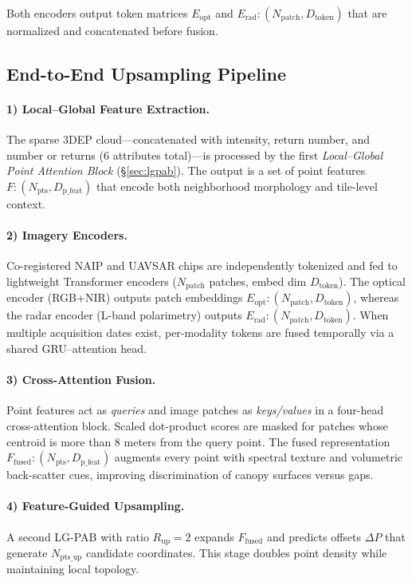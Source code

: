 \documentclass[remotesensing,article,submit,pdftex,moreauthors]{Definitions/mdpi}
\begin{document}
Both encoders output token matrices $E_{\text{opt}}$ and $E_{\text{rad}}: (N_{\text{patch}}, D_{\text{token}})$ that are normalized and concatenated before fusion.



\subsection{End-to-End Upsampling Pipeline}
\label{sec:pipeline}

\paragraph{1) Local–Global Feature Extraction.}
The sparse 3DEP cloud—concatenated with intensity, return number, and number or returns (6 attributes total)—is processed by the first \emph{Local–Global Point Attention Block} (§\ref{sec:lgpab}). The output is a set of point features $F: (N_{\text{pts}}, D_{\text{p\_feat}})$ that encode both neighborhood morphology and tile-level context.

\paragraph{2) Imagery Encoders.}
Co-registered NAIP and UAVSAR chips are independently tokenized and fed to lightweight Transformer encoders ($N_{\text{patch}}$ patches, embed dim $D_{\text{token}}$).  
The optical encoder (RGB+NIR) outputs patch embeddings $E_{\text{opt}}: (N_{\text{patch}}, D_{\text{token}})$, whereas the radar encoder (L-band polarimetry) outputs $E_{\text{rad}}: (N_{\text{patch}}, D_{\text{token}})$.  
When multiple acquisition dates exist, per-modality tokens are fused temporally via a shared GRU–attention head.

\paragraph{3) Cross-Attention Fusion.}
Point features act as \emph{queries} and image patches as \emph{keys/values} in a four-head cross-attention block.  
Scaled dot-product scores are masked for patches whose centroid is more than 8 meters from the query point. 
The fused representation $F_{\text{fused}}: (N_{\text{pts}}, D_{\text{p\_feat}})$ augments every point with spectral texture and volumetric back-scatter cues, improving discrimination of canopy surfaces versus gaps.

\paragraph{4) Feature-Guided Upsampling.}
A second LG-PAB with ratio $R_{\text{up}}=2$ expands $F_{\text{fused}}$ and predicts offsets $\Delta P$ that generate $N_{\text{pts\_up}}$ candidate coordinates. This stage doubles point density while maintaining local topology.
\end{document}
